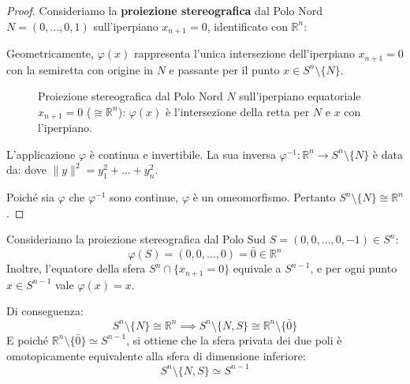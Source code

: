 \begin{proof}
Consideriamo la \textbf{proiezione stereografica} dal Polo Nord $N = (0, \dots, 0, 1)$ sull'iperpiano $x_{n+1} = 0$, identificato con $\mathbb{R}^n$:

Geometricamente, $\varphi(x)$ rappresenta l'unica intersezione dell'iperpiano $x_{n+1} = 0$ con la semiretta con origine in $N$ e passante per il punto $x \in S^n \setminus \{N\}$.

\begin{figure}[H]
    \centering
    \caption{Proiezione stereografica dal Polo Nord $N$ sull'iperpiano equatoriale $x_{n+1}=0$ ($\cong \mathbb{R}^n$): $\varphi(x)$ \`e l'intersezione della retta per $N$ e $x$ con l'iperpiano.}
\end{figure}

L'applicazione $\varphi$ è continua e invertibile. La sua inversa $\varphi^{-1}: \mathbb{R}^n \to S^n \setminus \{N\}$ è data da:
dove $\|y\|^2 = y_1^2 + \dots + y_n^2$.

Poiché sia $\varphi$ che $\varphi^{-1}$ sono continue, $\varphi$ è un omeomorfismo. Pertanto $S^n \setminus \{N\} \cong \mathbb{R}^n$.
\end{proof}

\begin{observacion}
Consideriamo la proiezione stereografica dal Polo Sud $S = (0, 0, \dots, 0, -1) \in S^n$:
\[
\varphi(S) = (0, 0, \dots, 0) = \bar{0} \in \mathbb{R}^n
\]
Inoltre, l'equatore della sfera $S^n \cap \{x_{n+1} = 0\}$ equivale a $S^{n-1}$, e per ogni punto $x \in S^{n-1}$ vale $\varphi(x) = x$.

Di conseguenza:
\[
S^n \setminus \{N\} \cong \mathbb{R}^n \implies S^n \setminus \{N, S\} \cong \mathbb{R}^n \setminus \{\bar{0}\}
\]
E poiché $\mathbb{R}^n \setminus \{\bar{0}\} \simeq S^{n-1}$, si ottiene che la sfera privata dei due poli è omotopicamente equivalente alla sfera di dimensione inferiore:
\[
S^n \setminus \{N, S\} \simeq S^{n-1}
\]
\end{observacion}

